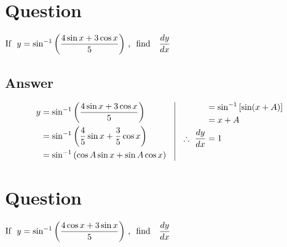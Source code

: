 \documentclass[17pt]{extarticle}
\begin{document}
\noindent
\begin{fleqn} 


\section{Question} 

$\begin{aligned}[t] 
\text{If \ } y =  \sin^{-1}\left(\frac{4\sin x + 3\cos x}{5}\right) \text{\,, \  find \ \  } \frac{dy}{dx}
\end{aligned}$

\subsection*{Answer}
\begin{equation} \nonumber
\begin{alignedat}{4}
y &=  \sin^{-1}\left(\frac{4\sin x + 3\cos x}{5}\right)\\
  &=  \sin^{-1}\left(\frac{4}{5}\sin x + \frac{3}{5}\cos x\right)\\
 &=  \sin^{-1}\left(\cos A\sin x + \sin A\cos x\right)\\
\end{alignedat}
\quad
\vrule
\quad 
\begin{alignedat}{4}
&=  \sin^{-1}\left[\sin (x + A)\right] \\
&=  x + A \\
\therefore \  \frac{dy}{dx} &= 1
& \\
& \\
\end{alignedat}
\end{equation}
\section{Question} 

$\begin{aligned}[t] 
\text{If \ } y =  \sin^{-1}\left(\frac{4\cos x + 3\sin x}{5}\right) \text{\,, \  find \ \  } \frac{dy}{dx}
\end{aligned}$


\end{fleqn}
\end{document}
